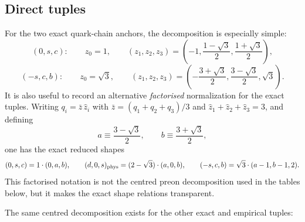 \documentclass[11pt]{article}
\begin{document}
\subsection{Direct tuples}

For the two exact quark-chain anchors, the decomposition is especially simple:
\[
  (0,s,c):
  \qquad
  z_0 = 1,
  \qquad
  (z_1,z_2,z_3)
  = \left(-1,\frac{1-\sqrt3}{2},\frac{1+\sqrt3}{2}\right),
\]
\[
  (-s,c,b):
  \qquad
  z_0 = \sqrt3,
  \qquad
  (z_1,z_2,z_3)
  = \left(-\frac{3+\sqrt3}{2},\frac{3-\sqrt3}{2},\sqrt3\right).
\]
It is also useful to record an alternative \emph{factorised} normalization
for the exact tuples.  Writing $q_i = \bar z\,\hat z_i$ with
$\bar z = (q_1+q_2+q_3)/3$ and $\hat z_1+\hat z_2+\hat z_3=3$, and defining
\[
  a \equiv \frac{3-\sqrt3}{2},
  \qquad
  b \equiv \frac{3+\sqrt3}{2},
\]
one has the exact reduced shapes
\[
  (0,s,c) = 1\cdot(0,a,b),\qquad
  (d,0,s)_{\rm phys} = (2-\sqrt3)\cdot(a,0,b),\qquad
  (-s,c,b) = \sqrt3\cdot(a-1,b-1,2).
\]
This factorised notation is not the centred preon decomposition used in the
tables below, but it makes the exact shape relations transparent.

The same centred decomposition exists for the other exact and empirical tuples:
\end{document}
